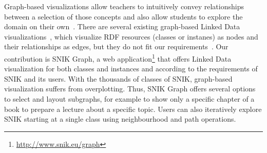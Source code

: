 \documentclass[conference]{IEEEtran}
\begin{document}
Graph-based visualizations allow teachers to intuitively convey relationships between a selection of those concepts and also allow students to explore the domain on their own~\cite{ontologybased}.
There are several existing graph-based Linked Data visualizations~\cite{linkeddatavisualization}, which visualize RDF resources (classes or instanes) as nodes and their relationships as edges, but they do not fit our requirements~\cite{visualizationoflargeontologies}.
Our contribution is SNIK Graph, a web application\footnote{\url{http://www.snik.eu/graph}} that offers Linked Data visualization for both classes and instances and according to the requirements of SNIK and its users.
With the thousands of classes of SNIK, graph-based visualization suffers from overplotting.
Thus, SNIK Graph offers several options to select and layout subgraphs, for example to show only a specific chapter of a book to prepare a lecture about a specific topic.
Users can also iteratively explore SNIK starting at a single class using neighbourhood and path operations. %
\end{document}
